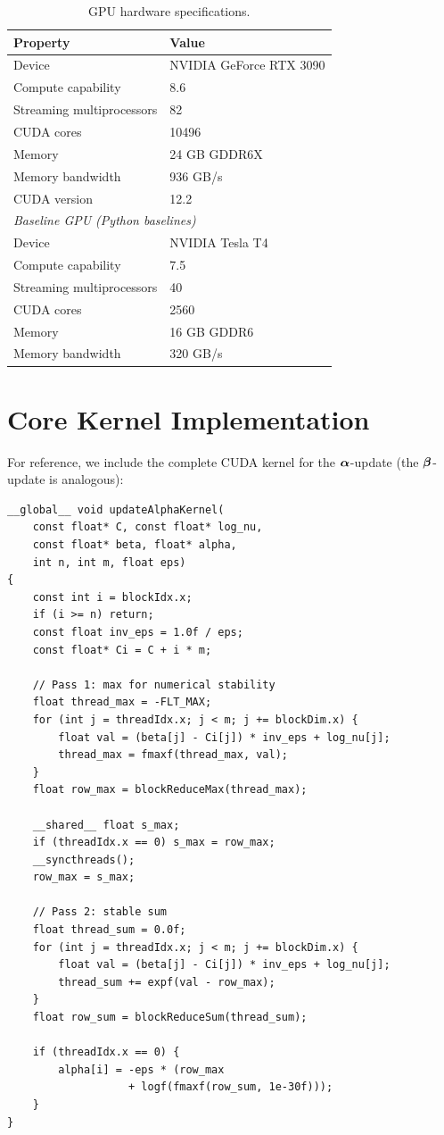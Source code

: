 \begin{table}[h]
\centering
\caption{GPU hardware specifications.}
\label{tab:gpu_specs}
\vspace{0.5em}
\small
\begin{tabular}{l l}
\toprule
\textbf{Property} & \textbf{Value} \\
\midrule
Device & NVIDIA GeForce RTX 3090 \\
Compute capability & 8.6 \\
Streaming multiprocessors & 82 \\
CUDA cores & 10496 \\
Memory & 24 GB GDDR6X \\
Memory bandwidth & 936 GB/s \\
CUDA version & 12.2 \\
\midrule
\multicolumn{2}{l}{\textit{Baseline GPU (Python baselines)}} \\
\midrule
Device & NVIDIA Tesla T4 \\
Compute capability & 7.5 \\
Streaming multiprocessors & 40 \\
CUDA cores & 2560 \\
Memory & 16 GB GDDR6 \\
Memory bandwidth & 320 GB/s \\
\bottomrule
\end{tabular}
\end{table}

\section{Core Kernel Implementation}
\label{app:kernel}

For reference, we include the complete CUDA kernel for the $\bm{\alpha}$-update (the $\bm{\beta}$-update is analogous):

\begin{verbatim}
__global__ void updateAlphaKernel(
    const float* C, const float* log_nu,
    const float* beta, float* alpha,
    int n, int m, float eps)
{
    const int i = blockIdx.x;
    if (i >= n) return;
    const float inv_eps = 1.0f / eps;
    const float* Ci = C + i * m;

    // Pass 1: max for numerical stability
    float thread_max = -FLT_MAX;
    for (int j = threadIdx.x; j < m; j += blockDim.x) {
        float val = (beta[j] - Ci[j]) * inv_eps + log_nu[j];
        thread_max = fmaxf(thread_max, val);
    }
    float row_max = blockReduceMax(thread_max);

    __shared__ float s_max;
    if (threadIdx.x == 0) s_max = row_max;
    __syncthreads();
    row_max = s_max;

    // Pass 2: stable sum
    float thread_sum = 0.0f;
    for (int j = threadIdx.x; j < m; j += blockDim.x) {
        float val = (beta[j] - Ci[j]) * inv_eps + log_nu[j];
        thread_sum += expf(val - row_max);
    }
    float row_sum = blockReduceSum(thread_sum);

    if (threadIdx.x == 0) {
        alpha[i] = -eps * (row_max
                   + logf(fmaxf(row_sum, 1e-30f)));
    }
}
\end{verbatim}
